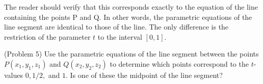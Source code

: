 \documentclass[handout]{ximera}
\begin{document}
The reader should verify that this corresponds exactly to the equation of the line containing the points P and Q.
In other words, the parametric equations of the line segment are identical to those of the line. 
The only difference is the restriction of the parameter $t$ to the interval $[0,1]$. 

\begin{problem}(Problem 5)
Use the parametric equations of the line segment between the points  $P(x_1, y_1, z_1)$ and $Q(x_2, y_2, z_2)$
to determine which points correspond to the $t$-values $0, 1/2, $ and $1$. 
Is one of these the midpoint of the line segment?
\end{problem}
 
\end{document}
